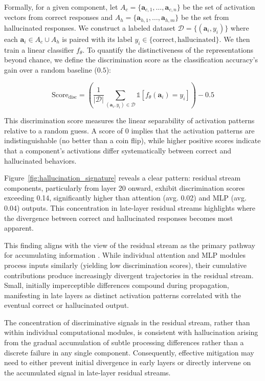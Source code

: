 \documentclass[11pt]{article}
\begin{document}
Formally, for a given component, let $A_c = \{\mathbf{a}_{c,1}, \dots, \mathbf{a}_{c,n}\}$ be the set of activation vectors from correct responses and $A_h = \{\mathbf{a}_{h,1}, \dots, \mathbf{a}_{h,m}\}$ be the set from hallucinated responses. We construct a labeled dataset $\mathcal{D} = \{(\mathbf{a}_i, y_i)\}$ where each $\mathbf{a}_i \in A_c \cup A_h$ is paired with its label $y_i \in \{\text{correct}, \text{hallucinated}\}$. We then train a linear classifier $f_\theta$. To quantify the distinctiveness of the representations beyond chance, we define the discrimination score as the classification accuracy's gain over a random baseline ($0.5$):

\begin{equation}
\text{Score}_{\text{disc}} = \left( \frac{1}{|\mathcal{D}|} \sum_{(\mathbf{a}_i, y_i) \in \mathcal{D}} \mathbb{1}[f_\theta(\mathbf{a}_i) = y_i] \right) - 0.5
\end{equation}

This discrimination score measures the linear separability of activation patterns relative to a random guess. A score of $0$ implies that the activation patterns are indistinguishable (no better than a coin flip), while higher positive scores indicate that a component's activations differ systematically between correct and hallucinated behaviors.

Figure~\ref{fig:hallucination_signature} reveals a clear pattern: residual stream components, particularly from layer 20 onward, exhibit discrimination scores exceeding 0.14, significantly higher than attention (avg. 0.02) and MLP (avg. 0.04) outputs. This concentration in late-layer residual streams highlights where the divergence between correct and hallucinated responses becomes most apparent.

This finding aligns with the view of the residual stream as the primary pathway for accumulating information \citep{elhage2021mathematical}. While individual attention and MLP modules process inputs similarly (yielding low discrimination scores), their cumulative contributions produce increasingly divergent trajectories in the residual stream. Small, initially imperceptible differences compound during propagation, manifesting in late layers as distinct activation patterns correlated with the eventual correct or hallucinated output.

The concentration of discriminative signals in the residual stream, rather than within individual computational modules, is consistent with hallucination arising from the gradual accumulation of subtle processing differences rather than a discrete failure in any single component. Consequently, effective mitigation may need to either prevent initial divergence in early layers or directly intervene on the accumulated signal in late-layer residual streams.
\end{document}
